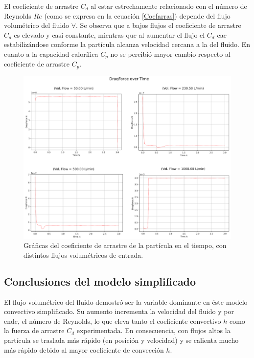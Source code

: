 \documentclass[11pt,stdletter,orderfromtodate,sigleft,twoside]{report}
\begin{document}
El coeficiente de arrastre $C_d$ al estar estrechamente relacionado con el número de Reynolds $Re$ (como se expresa en la ecuación \ref{Coefarras}) depende del flujo volumétrico del fluido $\forall$. Se observa que a bajos flujos el coeficiente de arrastre $C_d$ es elevado y casi constante, mientras que al aumentar el flujo el $C_d$ cae estabilizándose conforme la partícula alcanza velocidad cercana a la del fluido. En cuanto a la capacidad calorífica $C_p$ no se percibió mayor cambio respecto al coeficiente de arrastre $C_p$.

\begin{figure}[H]
    \centering
    \includegraphics[width=0.7\linewidth]{figures/Coefarras1.png}
    \caption{Gráficas del coeficiente de arrastre de la partícula en el tiempo, con distintos flujos volumétricos de entrada.}
    \label{fig:enter-label}
\end{figure}

\subsection{Conclusiones del modelo simplificado}

El flujo volumétrico del fluido demostró ser la variable dominante en éste modelo convectivo simplificado. Su aumento incrementa la velocidad del fluido y por ende, el número de Reynolds, lo que eleva tanto el coeficiente convectivo $h$ como la fuerza de arrastre $C_d$ experimentada. En consecuencia, con flujos altos la partícula se traslada más rápido (en posición y velocidad) y se calienta mucho más rápido debido al mayor coeficiente de convección $h$.\\
\end{document}
